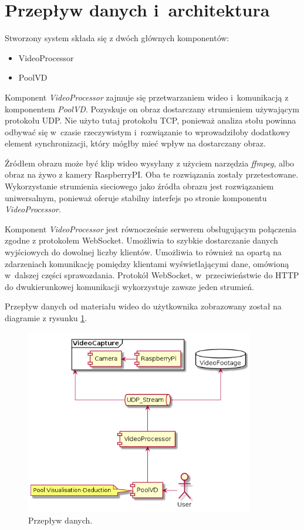 \documentclass[12pt]{article}
\begin{document}
\section{Przepływ danych i~architektura}

Stworzony system składa się z dwóch głównych komponentów:
\begin{itemize}[noitemsep]
    \item VideoProcessor
    \item PoolVD
\end{itemize}

Komponent \textit{VideoProcessor} zajmuje się przetwarzaniem wideo i~komunikacją z komponentem \textit{PoolVD}. Pozyskuje on obraz dostarczany strumieniem używającym protokołu UDP. Nie użyto tutaj protokołu TCP, ponieważ analiza stołu powinna odbywać się w~czasie rzeczywistym i~rozwiązanie to wprowadziłoby dodatkowy element synchronizacji, który mógłby mieć wpływ na dostarczany obraz.

Źródłem obrazu może być klip wideo wysyłany z użyciem narzędzia \textit{ffmpeg}, albo obraz na żywo z kamery RaspberryPI. Oba te rozwiązania zostały przetestowane. Wykorzystanie strumienia sieciowego jako źródła obrazu jest rozwiązaniem uniwersalnym, ponieważ oferuje stabilny interfejs po stronie komponentu \textit{VideoProcessor}.

Komponent \textit{VideoProcessor} jest równocześnie serwerem obsługującym połączenia zgodne z protokołem WebSocket. Umożliwia to szybkie dostarczanie danych wyjściowych do dowolnej liczby klientów. Umożliwia to również na opartą na zdarzeniach komunikację pomiędzy klientami wyświetlającymi dane, omówioną w~dalszej części sprawozdania. Protokół WebSocket, w~przeciwieństwie do HTTP do dwukierunkowej komunikacji wykorzystuje zawsze jeden strumień.

Przepływ danych od materiału wideo do użytkownika zobrazowany został na diagramie z rysunku \ref{dataflow}.


\begin{figure}[!htb]
    \centering
    \includegraphics[width=10cm]{./diagrams/out/data_flow.png}
    \caption{Przepływ danych.}
    \label{dataflow}
\end{figure}
\end{document}
